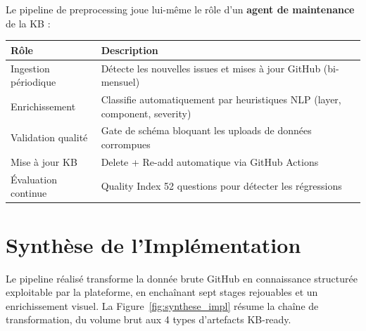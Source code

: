 \documentclass[12pt,a4paper]{report}
\begin{document}
Le pipeline de preprocessing joue lui-même le rôle d'un \textbf{agent de maintenance} de la KB :

\begin{longtable}{p{4cm}p{9cm}}
\toprule
\textbf{Rôle} & \textbf{Description} \\
\midrule
Ingestion périodique & Détecte les nouvelles issues et mises à jour GitHub (bi-mensuel) \\
Enrichissement & Classifie automatiquement par heuristiques NLP (layer, component, severity) \\
Validation qualité & Gate de schéma bloquant les uploads de données corrompues \\
Mise à jour KB & Delete + Re-add automatique via GitHub Actions \\
Évaluation continue & Quality Index 52 questions pour détecter les régressions \\
\bottomrule
\end{longtable}

\section{Synthèse de l'Implémentation}
\label{sec:synthese_implementation}

Le pipeline réalisé transforme la donnée brute GitHub en connaissance structurée exploitable par la plateforme, en enchaînant sept stages rejouables et un enrichissement visuel. La Figure~\ref{fig:synthese_impl} résume la chaîne de transformation, du volume brut aux 4 types d'artefacts KB-ready.
\end{document}
